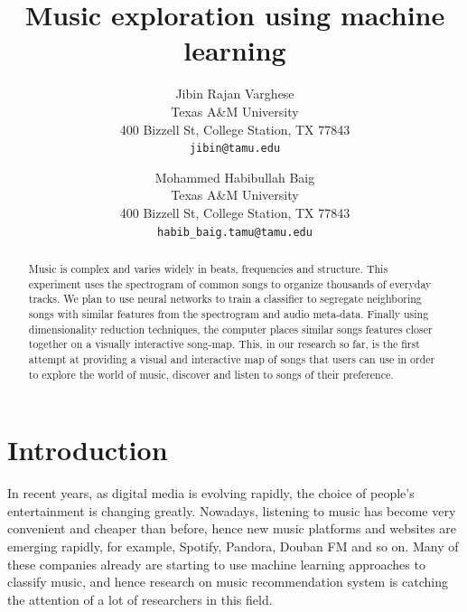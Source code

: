 \documentclass[10pt,twocolumn,letterpaper]{article}
\begin{document}
\title{Music exploration using machine learning }

\author{Jibin Rajan Varghese\\
Texas A\&M University\\
400 Bizzell St, College Station, TX 77843\\
{\tt\small jibin@tamu.edu}
\and
Mohammed Habibullah Baig\\
Texas A\&M University\\
400 Bizzell St, College Station, TX 77843\\
{\tt\small habib\_baig.tamu@tamu.edu}
}

\maketitle

\begin{abstract}
Music is complex and varies widely in beats, frequencies and structure. This experiment uses the spectrogram of common songs to organize thousands of everyday tracks. We plan to use neural networks to train a classifier to segregate neighboring songs with similar features from the spectrogram and audio meta-data. Finally using dimensionality reduction techniques, the computer places similar songs features closer together on a visually interactive song-map. This, in our research so far, is the first attempt at providing a visual and interactive map of songs that users can use in order to explore the world of music, discover and listen to songs of their preference.
\end{abstract}



\section{Introduction}
In recent years, as digital media is evolving rapidly, the choice of people's entertainment is changing greatly. Nowadays, listening to music has become very convenient and cheaper than before, hence new music platforms and websites are emerging rapidly, for example, Spotify, Pandora, Douban FM and so on. Many of these companies already are starting to use machine learning approaches to classify music, and hence research on music recommendation system is catching the attention of a lot of researchers in this field. \\
\end{document}

